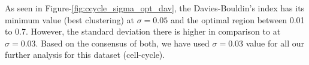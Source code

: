As seen in Figure-\ref{fig:ccycle_sigma_opt_dav}, the Davies-Bouldin's index has its minimum value (best clustering) at $\sigma=0.05$ and the optimal region between 0.01 to 0.7. However, the standard deviation there is higher in comparison to at $\sigma=0.03$. 
Based on the consensus of both, we have used $\sigma=0.03$ value for all our further analysis for this dataset (cell-cycle). 

